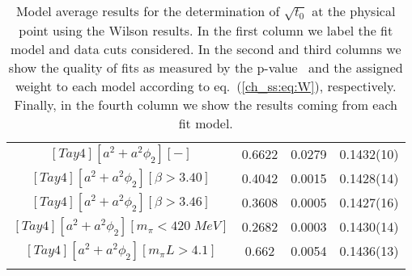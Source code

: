 \begin{longtable}{ c | c | c | c }
$[Tay4][a^2+a^2\phi_2][-]$ & 0.6622 & 0.0279 & 0.1432(10) \\
$[Tay4][a^2+a^2\phi_2][\beta>3.40]$ & 0.4042 & 0.0015 & 0.1428(14) \\
$[Tay4][a^2+a^2\phi_2][\beta>3.46]$ & 0.3608 & 0.0005 & 0.1427(16) \\
$[Tay4][a^2+a^2\phi_2][m_{\pi}<420\;MeV]$ & 0.2682 & 0.0003 & 0.1430(14) \\
$[Tay4][a^2+a^2\phi_2][m_{\pi}L>4.1]$ & 0.662 & 0.0054 & 0.1436(13) \\
\bottomrule
\caption{Model average results for the determination of $\sqrt{t_0}$ at the physical point using the Wilson results. In the first column we label the fit model and data cuts considered. In the second and third columns we show the quality of fits as measured by the p-value~\cite{chi_exp} and the assigned weight to each model according to eq.~(\ref{ch_ss:eq:W}), respectively. Finally, in the fourth column we show the results coming from each fit model.}
\end{longtable}

